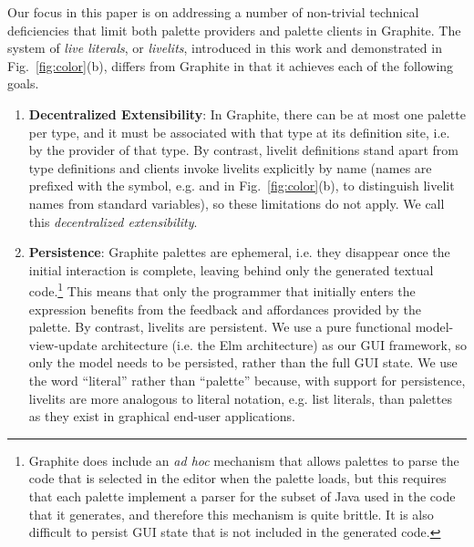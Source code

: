 Our focus in this paper is on addressing a number of non-trivial technical 
deficiencies that limit both palette providers and palette clients in Graphite. 
The system of \emph{live literals}, or \emph{livelits}, introduced in
this work and demonstrated in Fig.~\ref{fig:color}(b), differs from Graphite  
in that it achieves each of the following goals.
\begin{enumerate}
  \setlength\itemsep{0.5em}
  \item \textbf{Decentralized Extensibility}: 
    In Graphite, there can be at most one palette per type, 
    and it must be associated with that type at its definition site, i.e. by the provider of that type.
    By contrast, livelit definitions stand apart from type definitions 
    and clients invoke livelits explicitly by name (names are prefixed with the \li{\$} symbol, 
    e.g.  and  in Fig.~\ref{fig:color}(b), to distinguish
    livelit names from standard variables), so these limitations do not apply.
    We call this \emph{decentralized extensibility}.
  \item \textbf{Persistence}: Graphite palettes are {ephemeral}, 
  i.e. they disappear once the initial interaction is complete, 
  leaving behind only the generated textual code.\footnote{Graphite does include an \emph{ad hoc} mechanism that allows palettes to parse the code that is selected in the editor 
  when the palette loads, but this requires that each palette implement a parser for the subset of Java used in the code that it generates,
  and therefore this mechanism is quite brittle. It is also difficult to persist GUI state that is not included in the generated code.}
  This means that only the programmer that initially enters the expression 
  benefits from the feedback and affordances provided by the palette. 
  By contrast, livelits are persistent. We use a pure functional model-view-update architecture 
  (i.e. the Elm architecture) as our GUI framework, 
  so only the model needs to be persisted, rather than the full GUI state.  
  We use the word ``literal'' rather than ``palette'' because, with support for persistence, livelits
  are more analogous to literal notation, e.g. list literals, than palettes as they exist in graphical end-user 
  applications.


\end{enumerate}

